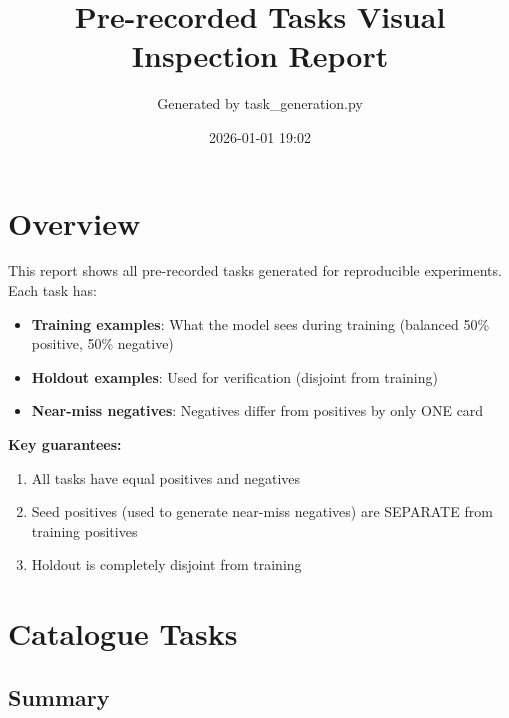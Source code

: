 \documentclass[10pt,a4paper]{article}
\title{Pre-recorded Tasks Visual Inspection Report}
\author{Generated by task\_generation.py}
\date{2026-01-01 19:02}
\begin{document}
\maketitle

\tableofcontents
\newpage

\section{Overview}

This report shows all pre-recorded tasks generated for reproducible experiments.
Each task has:
\begin{itemize}
    \item \textbf{Training examples}: What the model sees during training (balanced 50\% positive, 50\% negative)
    \item \textbf{Holdout examples}: Used for verification (disjoint from training)
    \item \textbf{Near-miss negatives}: Negatives differ from positives by only ONE card
\end{itemize}

\textbf{Key guarantees:}
\begin{enumerate}
    \item All tasks have equal positives and negatives
    \item Seed positives (used to generate near-miss negatives) are SEPARATE from training positives
    \item Holdout is completely disjoint from training
\end{enumerate}


\section{Catalogue Tasks}

\subsection{Summary}
\end{document}
